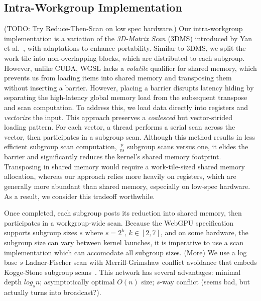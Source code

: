 \documentclass[sigconf]{acmart}
\begin{document}
\subsection{Intra-Workgroup Implementation}
(TODO: Try Reduce-Then-Scan on low spec hardware.)
Our intra-workgroup implementation is a variation of the \emph{3D-Matrix Scan} (3DMS) introduced by Yan et al.~\cite{}, with adaptations to enhance portability. Similar to 3DMS, we split the work tile into non-overlapping blocks, which are distributed to each subgroup. However, unlike CUDA, WGSL lacks a \emph{volatile} qualifier for shared memory, which prevents us from loading items into shared memory and transposing them without inserting a barrier. However, placing a barrier disrupts latency hiding by separating the high-latency global memory load from the subsequent transpose and scan computation. To address this, we load data directly into registers and \emph{vectorize} the input. This approach preserves a \emph{coalesced} but vector-strided loading pattern. For each vector, a thread performs a serial scan across the vector, then participates in a subgroup scan. Although this method results in less efficient subgroup scan computation, $\frac{p}{vs}$ subgroup scans versus one, it elides the barrier and significantly reduces the kernel's shared memory footprint. Transposing in shared memory would require a work-tile-sized shared memory allocation, whereas our approach relies more heavily on registers, which are generally more abundant than shared memory, especially on low-spec hardware. As a result, we consider this tradeoff worthwhile.

Once completed, each subgroup posts its reduction into shared memory, then participates in a workgroup-wide scan. Because the WebGPU specification supports subgroup sizes $s \text{ where } s = 2^k, \, k \in [2, 7]$, and on some hardware, the subgroup size can vary between kernel launches, it is imperative to use a scan implementation which can accomodate all subgroup sizes. (More) We use a log base $s$ Ladner-Fischer scan with Merrill-Grimshaw conflict avoidance that embeds Kogge-Stone subgroup scans~\cite{}. This network has several advantages: minimal depth $log_s n$; asymptotically optimal $O(n)$ size; $s$-way conflict (seems bad, but actually turns into broadcast?).
\end{document}
